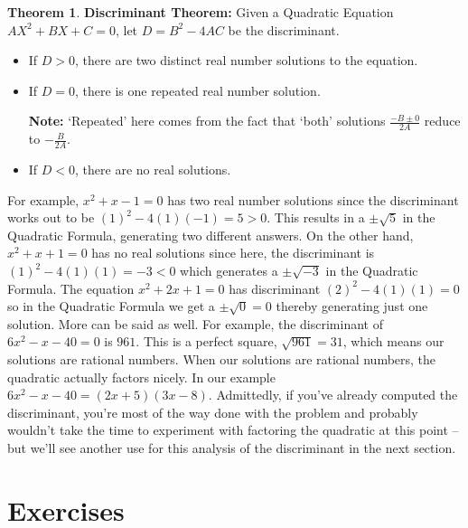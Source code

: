 \documentclass[11pt]{article}
\theoremstyle{definition}  %
\newtheorem{thm}{\bf Theorem}
\newcommand{\bbm}{\begin{boxedminipage}{6.41in}}
\newcommand{\ebm}{\end{boxedminipage}}
\begin{document}
\medskip

\colorbox{ResultColor}{\bbm
\begin{thm} \textbf{Discriminant Theorem:} \label{discriminanttheoremrealversion} Given a Quadratic Equation $AX^2 + BX + C = 0$, let $D = B^2 - 4AC$ be the discriminant.

\begin{itemize}

\item  If $D > 0$, there are two distinct real number solutions to the equation. 

\item  If $D = 0$, there is one repeated real number solution.  

\textbf{Note:}  `Repeated' here comes from the fact that `both' solutions $\frac{-B \pm 0}{2A}$ reduce to $-\frac{B}{2A}$.

\item  If $D < 0$, there are no real solutions.

\end{itemize}

\end{thm}
\ebm}

\medskip

For example, $x^2 + x - 1 = 0$ has two real number solutions since the discriminant works out to be $(1)^2 - 4(1)(-1) = 5 > 0$.  This results in a $\pm \sqrt{5}$ in the Quadratic Formula, generating two different answers.  On the other hand, $x^2 + x + 1 = 0$ has no real solutions since here, the discriminant is $(1)^2 - 4(1)(1) = -3 < 0$ which generates a $\pm \sqrt{-3}$ in the Quadratic Formula.  The equation $x^2 + 2x +1 = 0$ has discriminant $(2)^2 - 4(1)(1) = 0$ so in the Quadratic Formula we get a $\pm \sqrt{0} = 0$ thereby  generating just one solution.  More can be said as well.  For example, the discriminant of $6x^2 - x - 40 = 0$ is $961$.  This is a perfect square, $\sqrt{961} = 31$, which means our solutions are rational numbers.  When our solutions are rational numbers, the quadratic actually factors nicely. In our example  $6x^2 - x - 40 = (2x+5)(3x-8)$.  Admittedly,  if you've already computed the discriminant, you're most of the way done with the problem and probably wouldn't take the time to experiment with factoring the quadratic at this point -- but we'll see another use for this analysis of the discriminant in the next section.

\newpage

\section{Exercises}
\end{document}
